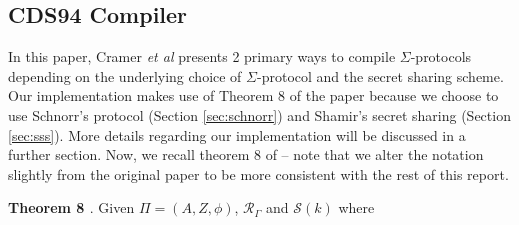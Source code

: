\subsection{CDS94 Compiler}
In this paper, Cramer {\em{et al}} \cite{CDS94} presents 2 primary ways to compile $\Sigma$-protocols depending 
on the underlying choice of $\Sigma$-protocol and the secret sharing scheme. Our implementation makes use of Theorem 
8 of the paper because we choose to use Schnorr's protocol (Section \ref{sec:schnorr}) and Shamir's secret sharing 
(Section \ref{sec:sss}). More details regarding our implementation will be discussed in a further section. Now, we recall 
theorem 8 of \cite{CDS94} -- note that we alter the notation slightly from the original paper to be more consistent 
with the rest of this report.






\textbf{Theorem 8 \cite{CDS94}}. Given $\Pi = (A, Z, \phi)$, $\mathcal R_\Gamma$ and $\mathcal S(k)$ where

